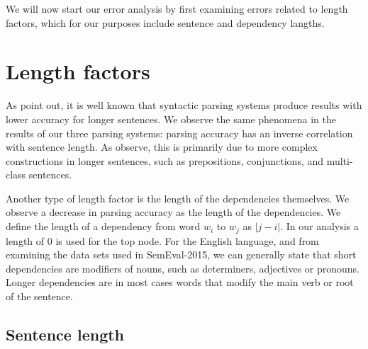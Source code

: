 


\vspace{1ex}

We will now start our error analysis by first examining errors related to length factors, which for our purposes include sentence and dependency langths.
    
\section{Length factors}

As  point out, it is well known that syntactic parsing systems produce results with lower accuracy for longer sentences. We observe the same phenomena in the results of our three parsing systems: parsing accuracy has an inverse correlation with sentence length. As  observe, this is primarily due to more complex constructions in longer sentences, such as prepositions, conjunctions, and multi-class sentences.

Another type of length factor is the length of the dependencies themselves. We observe a decrease in parsing accuracy as the length of the dependencies. We define the length of a dependency from word $w_i$ to $w_j$ as $|j - i|$. In our analysis a length of $0$ is used for the top node. For the English language, and from examining the data sets used in SemEval-2015, we can generally state that short dependencies are modifiers of nouns, such as determiners, adjectives or pronouns. Longer dependencies are in most cases words that modify the main verb or root of the sentence.

\subsection{Sentence length}

